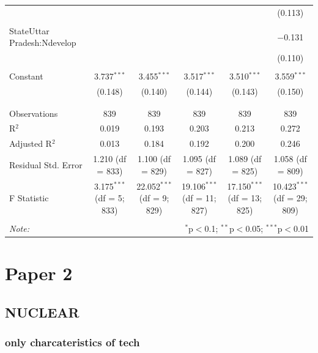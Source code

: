 \documentclass[
]{article}
\begin{document}
\begin{landscape}
\begin{table}[!htbp]
\begin{tabular}{@{\extracolsep{5pt}}lccccc}
  &  &  &  &  & (0.113) \\ 
  & & & & & \\ 
 StateUttar Pradesh:Ndevelop &  &  &  &  & $-$0.131 \\ 
  &  &  &  &  & (0.110) \\ 
  & & & & & \\ 
 Constant & 3.737$^{***}$ & 3.455$^{***}$ & 3.517$^{***}$ & 3.510$^{***}$ & 3.559$^{***}$ \\ 
  & (0.148) & (0.140) & (0.144) & (0.143) & (0.150) \\ 
  & & & & & \\ 
\hline \\[-1.8ex] 
Observations & 839 & 839 & 839 & 839 & 839 \\ 
R$^{2}$ & 0.019 & 0.193 & 0.203 & 0.213 & 0.272 \\ 
Adjusted R$^{2}$ & 0.013 & 0.184 & 0.192 & 0.200 & 0.246 \\ 
Residual Std. Error & 1.210 (df = 833) & 1.100 (df = 829) & 1.095 (df = 827) & 1.089 (df = 825) & 1.058 (df = 809) \\ 
F Statistic & 3.175$^{***}$ (df = 5; 833) & 22.052$^{***}$ (df = 9; 829) & 19.106$^{***}$ (df = 11; 827) & 17.150$^{***}$ (df = 13; 825) & 10.423$^{***}$ (df = 29; 809) \\ 
\hline 
\hline \\[-1.8ex] 
\textit{Note:}  & \multicolumn{5}{r}{$^{*}$p$<$0.1; $^{**}$p$<$0.05; $^{***}$p$<$0.01} \\ 
\end{tabular} 
\end{table} 
\endgroup

\end{landscape}

\hypertarget{paper-2}{%
\section{Paper 2}\label{paper-2}}

\hypertarget{nuclear}{%
\subsection{NUCLEAR}\label{nuclear}}

\hypertarget{only-charcateristics-of-tech}{%
\subsubsection{only charcateristics of
tech}\label{only-charcateristics-of-tech}}
\end{document}
